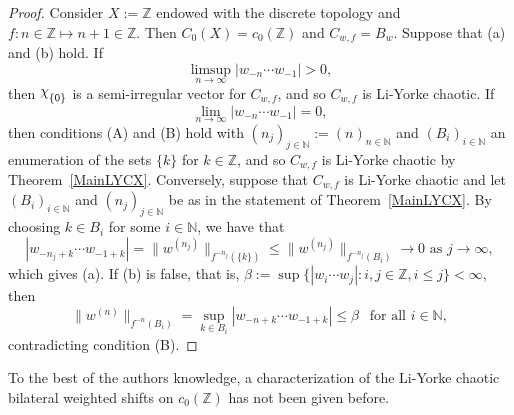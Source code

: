 \documentclass[12pt]{amsart}
\theoremstyle{theorem}
\theoremstyle{definition}
\theoremstyle{remark} \theoremstyle{question} \theoremstyle{example}
\newcommand{\N}{\mathbb{N}}
\newcommand{\Z}{\mathbb{Z}}
\DeclareRobustCommand{\rchi}{{\mathpalette\irchi\relax}}
\newcommand{\irchi}[2]{\raisebox{\depth}{$#1\chi$}}
\begin{document}
\begin{proof}
Consider $X\!:= \Z$ endowed with the discrete topology and $f : n \in \Z \mapsto n+1 \in \Z$.
Then $C_0(X) = c_0(\Z)$ and $C_{w,f} = B_w$. Suppose that (a) and (b) hold. If
\[
\limsup_{n \to \infty} |w_{-n} \cdots w_{-1}| > 0,
\]
then $\rchi_{\{0\}}$ is a semi-irregular vector for $C_{w,f}$, and so $C_{w,f}$ is Li-Yorke chaotic. If
\[
\lim_{n \to \infty} |w_{-n} \cdots w_{-1}| = 0,
\]
then conditions (A) and (B) hold with $(n_j)_{j \in \N}\!:= (n)_{n \in \N}$ and $(B_i)_{i \in \N}$ an enumeration of the sets $\{k\}$ 
for $k \in \Z$, and so $C_{w,f}$ is Li-Yorke chaotic by Theorem~\ref{MainLYCX}.
Conversely, suppose that $C_{w,f}$ is Li-Yorke chaotic and let $(B_i)_{i \in \N}$ and $(n_j)_{j \in \N}$ be as in the statement of Theorem~\ref{MainLYCX}. By choosing $k \in B_i$ for some $i \in \N$, we have that
\[
|w_{-n_j + k} \cdots w_{-1 + k}| = \|w^{(n_j)}\|_{f^{-n_j}(\{k\})} \leq \|w^{(n_j)}\|_{f^{-n_j}(B_i)} \to 0 \text{ as } j \to \infty,
\]
which gives (a). If (b) is false, that is, $\beta\!:= \sup\{|w_i \cdots w_j| : i,j \in \Z, i \leq j\} < \infty$, then
\[
\|w^{(n)}\|_{f^{-n}(B_i)} = \sup_{k \in B_i} |w_{-n+k} \cdots w_{-1+k}| \leq \beta \ \ \text{ for all } i \in \N,
\]
contradicting condition (B).
\end{proof}

To the best of the authors knowledge, a characterization of the Li-Yorke chaotic bilateral weighted shifts on $c_0(\Z)$ has not been given before.
\end{document}
